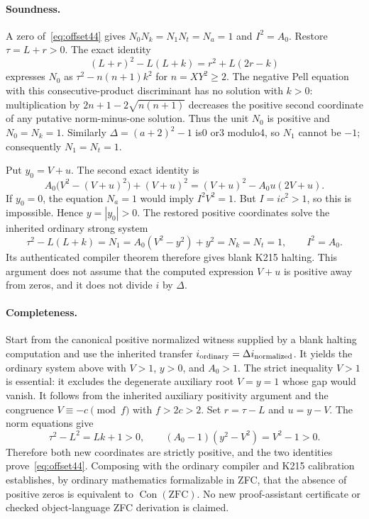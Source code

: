 \paragraph{Soundness.}
A zero of~\eqref{eq:offset44} gives
$N_0N_k=N_1N_t=N_a=1$ and $I^2=A_0$. Restore
$\tau=L+r>0$. The exact identity
\[
(L+r)^2-L(L+k)=r^2+L(2r-k)
\]
expresses $N_0$ as $\tau^2-n(n+1)k^2$ for $n=XY^2\ge2$.
The negative Pell equation with this consecutive-product discriminant
has no solution with $k>0$: multiplication by
$2n+1-2\sqrt{n(n+1)}$ decreases the positive second coordinate of any
putative norm-minus-one solution. Thus the unit $N_0$ is positive and
$N_0=N_k=1$. Similarly $\Delta=(a+2)^2-1$ is0 or3 modulo4, so
$N_1$ cannot be $-1$; consequently $N_1=N_t=1$.

Put $y_0=V+u$. The second exact identity is
\[
A_0\bigl(V^2-(V+u)^2\bigr)+(V+u)^2
=(V+u)^2-A_0u(2V+u).
\]
If $y_0=0$, the equation $N_a=1$ would imply $I^2V^2=1$.
But $I=ic^2>1$, so this is impossible. Hence $y=|y_0|>0$.
The restored positive coordinates solve the inherited ordinary strong
system
\[
\tau^2-L(L+k)=N_1=A_0(V^2-y^2)+y^2=N_k=N_t=1,
\qquad I^2=A_0.
\]
Its authenticated compiler theorem therefore gives blank K215 halting.
This argument does not assume that the computed expression $V+u$ is
positive away from zeros, and it does not divide $i$ by $\Delta$.

\paragraph{Completeness.}
Start from the canonical positive normalized witness supplied by a blank
halting computation and use the inherited transfer
$i_{\rm ordinary}=\Delta i_{\rm normalized}$. It yields the ordinary
system above with $V>1$, $y>0$, and $A_0>1$. The strict inequality $V>1$
is essential: it excludes the degenerate auxiliary root $V=y=1$ whose
gap would vanish. It follows from the inherited auxiliary positivity
argument and the congruence $V\equiv-c\pmod f$ with $f>2c>2$.
Set $r=\tau-L$ and $u=y-V$. The norm equations give
\[
\tau^2-L^2=Lk+1>0,\qquad
(A_0-1)(y^2-V^2)=V^2-1>0.
\]
Therefore both new coordinates are strictly positive, and the two
identities prove~\eqref{eq:offset44}. Composing with the ordinary compiler
and K215 calibration establishes, by ordinary mathematics formalizable
in ZFC, that the absence of positive zeros is equivalent to
$\operatorname{Con}(\mathrm{ZFC})$. No new proof-assistant certificate or
checked object-language ZFC derivation is claimed.


